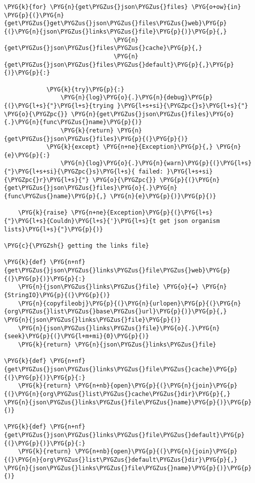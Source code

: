 \begin{Verbatim}[commandchars=\\\{\}]
        \PYG{k}{for} \PYG{n}{get\PYGZus{}json\PYGZus{}files} \PYG{o+ow}{in} \PYG{p}{(}\PYG{n}{get\PYGZus{}get\PYGZus{}json\PYGZus{}files\PYGZus{}web}\PYG{p}{(}\PYG{n}{json\PYGZus{}links\PYGZus{}file}\PYG{p}{)}\PYG{p}{,}
                               \PYG{n}{get\PYGZus{}json\PYGZus{}files\PYGZus{}cache}\PYG{p}{,}
                               \PYG{n}{get\PYGZus{}json\PYGZus{}files\PYGZus{}default}\PYG{p}{,}\PYG{p}{)}\PYG{p}{:}

            \PYG{k}{try}\PYG{p}{:}
                \PYG{n}{log}\PYG{o}{.}\PYG{n}{debug}\PYG{p}{(}\PYG{l+s}{"}\PYG{l+s}{trying }\PYG{l+s+si}{\PYGZpc{}s}\PYG{l+s}{"} \PYG{o}{\PYGZpc{}} \PYG{n}{get\PYGZus{}json\PYGZus{}files}\PYG{o}{.}\PYG{n}{func\PYGZus{}name}\PYG{p}{)}
                \PYG{k}{return} \PYG{n}{get\PYGZus{}json\PYGZus{}files}\PYG{p}{(}\PYG{p}{)}
            \PYG{k}{except} \PYG{n+ne}{Exception}\PYG{p}{,} \PYG{n}{e}\PYG{p}{:}
                \PYG{n}{log}\PYG{o}{.}\PYG{n}{warn}\PYG{p}{(}\PYG{l+s}{"}\PYG{l+s+si}{\PYGZpc{}s}\PYG{l+s}{ failed: }\PYG{l+s+si}{\PYGZpc{}r}\PYG{l+s}{"} \PYG{o}{\PYGZpc{}} \PYG{p}{(}\PYG{n}{get\PYGZus{}json\PYGZus{}files}\PYG{o}{.}\PYG{n}{func\PYGZus{}name}\PYG{p}{,} \PYG{n}{e}\PYG{p}{)}\PYG{p}{)}
    
    \PYG{k}{raise} \PYG{n+ne}{Exception}\PYG{p}{(}\PYG{l+s}{"}\PYG{l+s}{Couldn}\PYG{l+s}{'}\PYG{l+s}{t get json organism lists}\PYG{l+s}{"}\PYG{p}{)}

\PYG{c}{\PYGZsh{} getting the links file}

\PYG{k}{def} \PYG{n+nf}{get\PYGZus{}json\PYGZus{}links\PYGZus{}file\PYGZus{}web}\PYG{p}{(}\PYG{p}{)}\PYG{p}{:}
    \PYG{n}{json\PYGZus{}links\PYGZus{}file} \PYG{o}{=} \PYG{n}{StringIO}\PYG{p}{(}\PYG{p}{)}
    \PYG{n}{copyfileobj}\PYG{p}{(}\PYG{n}{urlopen}\PYG{p}{(}\PYG{n}{org\PYGZus{}list\PYGZus{}base\PYGZus{}url}\PYG{p}{)}\PYG{p}{,} \PYG{n}{json\PYGZus{}links\PYGZus{}file}\PYG{p}{)}
    \PYG{n}{json\PYGZus{}links\PYGZus{}file}\PYG{o}{.}\PYG{n}{seek}\PYG{p}{(}\PYG{l+m+mi}{0}\PYG{p}{)}
    \PYG{k}{return} \PYG{n}{json\PYGZus{}links\PYGZus{}file}

\PYG{k}{def} \PYG{n+nf}{get\PYGZus{}json\PYGZus{}links\PYGZus{}file\PYGZus{}cache}\PYG{p}{(}\PYG{p}{)}\PYG{p}{:}
    \PYG{k}{return} \PYG{n+nb}{open}\PYG{p}{(}\PYG{n}{join}\PYG{p}{(}\PYG{n}{org\PYGZus{}list\PYGZus{}cache\PYGZus{}dir}\PYG{p}{,} \PYG{n}{json\PYGZus{}links\PYGZus{}file\PYGZus{}name}\PYG{p}{)}\PYG{p}{)}

\PYG{k}{def} \PYG{n+nf}{get\PYGZus{}json\PYGZus{}links\PYGZus{}file\PYGZus{}default}\PYG{p}{(}\PYG{p}{)}\PYG{p}{:}
    \PYG{k}{return} \PYG{n+nb}{open}\PYG{p}{(}\PYG{n}{join}\PYG{p}{(}\PYG{n}{org\PYGZus{}list\PYGZus{}default\PYGZus{}dir}\PYG{p}{,} \PYG{n}{json\PYGZus{}links\PYGZus{}file\PYGZus{}name}\PYG{p}{)}\PYG{p}{)}



\end{Verbatim}
